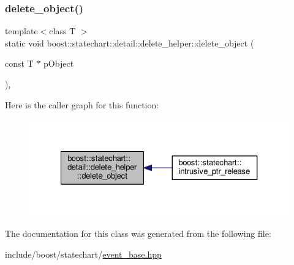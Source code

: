 \subsubsection{\texorpdfstring{delete\+\_\+object()}{delete\_object()}}
{\footnotesize\ttfamily template$<$class T $>$ \\
static void boost\+::statechart\+::detail\+::delete\+\_\+helper\+::delete\+\_\+object (\begin{DoxyParamCaption}\item[{const T $\ast$}]{p\+Object }\end{DoxyParamCaption})\hspace{0.3cm}{\ttfamily [inline]}, {\ttfamily [static]}}

Here is the caller graph for this function\+:
\nopagebreak
\begin{figure}[H]
\begin{center}
\leavevmode
\includegraphics[width=327pt]{classboost_1_1statechart_1_1detail_1_1delete__helper_a473a6fc721b85016da9976e59aac399c_icgraph}
\end{center}
\end{figure}


The documentation for this class was generated from the following file\+:\begin{DoxyCompactItemize}
\item 
include/boost/statechart/\mbox{\hyperlink{event__base_8hpp}{event\+\_\+base.\+hpp}}\end{DoxyCompactItemize}
